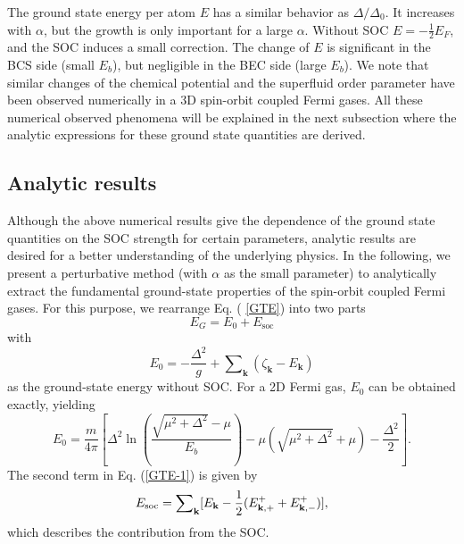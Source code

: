 \documentclass[pra,print,showpacs,superscriptaddress,twocolumn]{revtex4}
\begin{document}
The ground state energy per atom $E$ has a similar behavior as $\Delta
/\Delta _{0}$. It increases with $\alpha $, but the growth is only important
for a large $\alpha $. Without SOC $E=-\frac{1}{2}E_{F}$, and the SOC
induces a small correction. The change of $E$ is significant in the BCS side
(small $E_{b}$), but negligible in the BEC side (large $E_{b}$). We note
that similar changes of the chemical potential and the superfluid order
parameter have been observed numerically in a 3D spin-orbit coupled Fermi
gases. All these numerical observed phenomena will be explained in the next
subsection where the analytic expressions for these ground state quantities
are derived.

\subsection{Analytic results}

Although the above numerical results give the dependence of the ground state
quantities on the SOC strength for certain parameters, analytic results are
desired for a better understanding of the underlying physics. In the
following, we present a perturbative method (with $\alpha $ as the small
parameter) to analytically extract the fundamental ground-state properties
of the spin-orbit coupled Fermi gases. For this purpose, we rearrange Eq. (%
\ref{GTE}) into two parts%
\begin{equation}
E_{G}=E_{0}+E_{\text{soc}}  \label{GTE-1}
\end{equation}%
with
\begin{equation}
E_{0}=-\frac{\Delta ^{2}}{g}+\sum\nolimits_{\mathbf{k}}(\zeta _{\mathbf{k}%
}-E_{\mathbf{k}})  \label{GW}
\end{equation}%
as the ground-state energy without SOC. For a 2D Fermi gas, $E_{0}$ can be
obtained exactly, yielding \cite{MR}
\begin{equation}
E_{0}=\frac{m}{4\pi }[\Delta ^{2}\ln (\frac{\sqrt{\mu ^{2}+\Delta ^{2}}-\mu
}{E_{b}})-\mu (\sqrt{\mu ^{2}+\Delta ^{2}}+\mu )-\frac{\Delta ^{2}}{2}].
\label{GTWS}
\end{equation}%
The second term in Eq. (\ref{GTE-1}) is given by
\begin{equation}
E_{\text{soc}}=\sum\nolimits_{\mathbf{k}}[E_{\mathbf{k}}-\frac{1}{2}(E_{%
\mathbf{k},+}^{+}+E_{\mathbf{k},-}^{+})],  \label{GWO}
\end{equation}%
which describes the contribution from the SOC.
\end{document}
